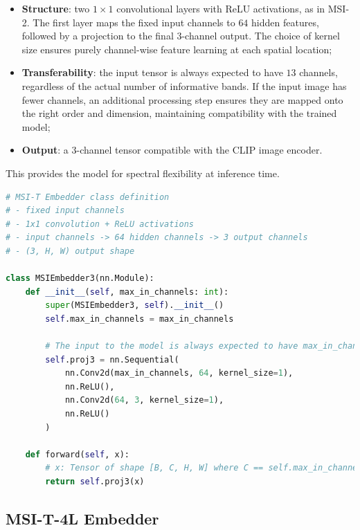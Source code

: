 \documentclass[a4paper, oneside, english]{sapthesis} %
\begin{document}
\begin{itemize}
    \item \textbf{Structure}: two $1\times1$ convolutional layers with ReLU activations, as in MSI-2. The first layer maps the fixed input channels to $64$ hidden features, followed by a projection to the final 3-channel output. The choice of kernel size ensures purely channel-wise feature learning at each spatial location;
    \item \textbf{Transferability}: the input tensor is always expected to have $13$ channels, regardless of the actual number of informative bands. If the input image has fewer channels, an additional processing step ensures they are mapped onto the right order and dimension, maintaining compatibility with the trained model;
    \item \textbf{Output}: a $3$-channel tensor compatible with the CLIP image encoder.
\end{itemize}

This provides the model for spectral flexibility at inference time.

\vspace{0.5cm}

\begin{lstlisting}[language=Python, caption={MSI-T Embedder implemented in PyTorch.},  label={lst:msi_t}]
# MSI-T Embedder class definition
# - fixed input channels
# - 1x1 convolution + ReLU activations
# - input channels -> 64 hidden channels -> 3 output channels
# - (3, H, W) output shape

class MSIEmbedder3(nn.Module):
    def __init__(self, max_in_channels: int):
        super(MSIEmbedder3, self).__init__()
        self.max_in_channels = max_in_channels

        # The input to the model is always expected to have max_in_channels -> the forward is different
        self.proj3 = nn.Sequential(
            nn.Conv2d(max_in_channels, 64, kernel_size=1),
            nn.ReLU(),
            nn.Conv2d(64, 3, kernel_size=1),
            nn.ReLU()
        )

    def forward(self, x):
        # x: Tensor of shape [B, C, H, W] where C == self.max_in_channels
        return self.proj3(x)
\end{lstlisting}


\subsection{MSI-T-4L Embedder}\label{sec:msi_t_4l}
\end{document}
